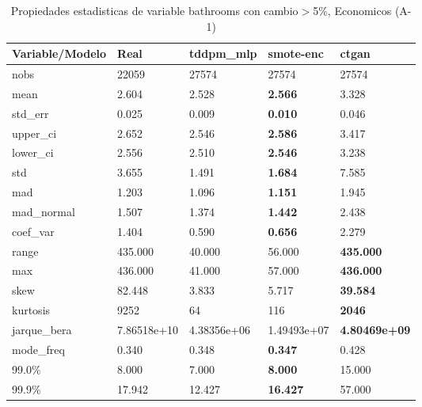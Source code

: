 \begin{table}[H]
\centering
\fontsize{8}{14}\selectfont
\caption{Propiedades estadisticas de variable bathrooms con cambio\ensuremath{>}5\%, Economicos (A-1)}
\label{table-stats-economicos-a-1-bathrooms-short}
\begin{tabular}{|l|m{10em}|m{10em}|m{10em}|m{10em}|}
\hline
 \rowcolor[gray]{0.8}
Variable/Modelo & Real & tddpm\_mlp & smote-enc & ctgan \\
\hline nobs & 22059 & 27574 & 27574 & 27574 \\
\hline mean & 2.604 & 2.528 & \bfseries 2.566 & \cellcolor[rgb]{0.9, 0.54, 0.52} 3.328 \\
\hline std\_err & 0.025 & 0.009 & \bfseries 0.010 & \cellcolor[rgb]{0.9, 0.54, 0.52} 0.046 \\
\hline upper\_ci & 2.652 & 2.546 & \bfseries 2.586 & \cellcolor[rgb]{0.9, 0.54, 0.52} 3.417 \\
\hline lower\_ci & 2.556 & 2.510 & \bfseries 2.546 & \cellcolor[rgb]{0.9, 0.54, 0.52} 3.238 \\
\hline std & 3.655 & 1.491 & \bfseries 1.684 & \cellcolor[rgb]{0.9, 0.54, 0.52} 7.585 \\
\hline mad & 1.203 & 1.096 & \bfseries 1.151 & \cellcolor[rgb]{0.9, 0.54, 0.52} 1.945 \\
\hline mad\_normal & 1.507 & 1.374 & \bfseries 1.442 & \cellcolor[rgb]{0.9, 0.54, 0.52} 2.438 \\
\hline coef\_var & 1.404 & 0.590 & \bfseries 0.656 & \cellcolor[rgb]{0.9, 0.54, 0.52} 2.279 \\
\hline range & 435.000 & \cellcolor[rgb]{0.9, 0.54, 0.52} 40.000 & 56.000 & \bfseries 435.000 \\
\hline max & 436.000 & \cellcolor[rgb]{0.9, 0.54, 0.52} 41.000 & 57.000 & \bfseries 436.000 \\
\hline skew & 82.448 & \cellcolor[rgb]{0.9, 0.54, 0.52} 3.833 & 5.717 & \bfseries 39.584 \\
\hline kurtosis & 9252 & \cellcolor[rgb]{0.9, 0.54, 0.52} 64 & 116 & \bfseries 2046 \\
\hline jarque\_bera & 7.86518e+10 & \cellcolor[rgb]{0.9, 0.54, 0.52} 4.38356e+06 & 1.49493e+07 & \bfseries 4.80469e+09 \\
\hline mode\_freq & 0.340 & 0.348 & \bfseries 0.347 & \cellcolor[rgb]{0.9, 0.54, 0.52} 0.428 \\
\hline 99.0\% & 8.000 & 7.000 & \bfseries 8.000 & \cellcolor[rgb]{0.9, 0.54, 0.52} 15.000 \\
\hline 99.9\% & 17.942 & 12.427 & \bfseries 16.427 & \cellcolor[rgb]{0.9, 0.54, 0.52} 57.000 \\
\hline
\end{tabular}
\end{table}
